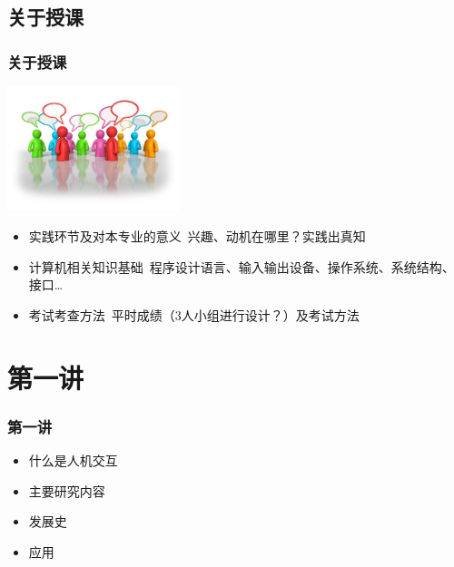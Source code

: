 \documentclass{beamer}
\begin{document}
\subsection{关于授课}
\begin{frame}
	\frametitle{关于授课}
	\begin{center}
		\includegraphics[width=5cm]{images/DiscussionForum.jpg}
	\end{center}
	\beamertemplatetransparentcovereddynamicmedium
	\begin{itemize}[<+->]
		\item 实践环节及对本专业的意义~{\tiny 兴趣、动机在哪里？实践出真知}
		\item 计算机相关知识基础~{\tiny 程序设计语言、输入输出设备、操作系统、系统结构、接口\dots}
		\item 考试考查方法~{\tiny 平时成绩（3人小组进行设计？）及考试方法}
	\end{itemize}
\end{frame}

\section{第一讲}
\begin{frame}
	\frametitle{第一讲}
	\begin{itemize}
		\item 什么是人机交互
		\item 主要研究内容
		\item 发展史
		\item 应用
	\end{itemize}
\end{frame}
\end{document}
